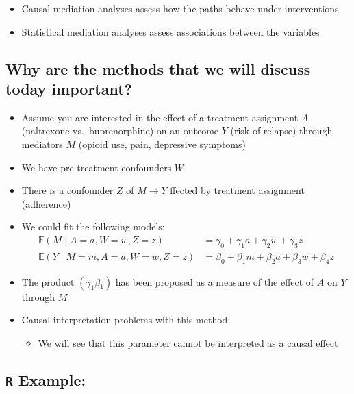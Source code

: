 \documentclass[
  12pt,
]{book}
\providecommand{\tightlist}{%
  \setlength{\itemsep}{0pt}\setlength{\parskip}{0pt}}
\theoremstyle{definition}
\theoremstyle{definition}
\theoremstyle{definition}
\newcommand{\E}{\mathbb{E}}
\newcommand{\1}{\mathbbm{1}}
\begin{document}
\begin{itemize}
\tightlist
\item
  Causal mediation analyses assess how the paths behave under interventions
\item
  Statistical mediation analyses assess associations between the variables
\end{itemize}

\hypertarget{why-are-the-methods-that-we-will-discuss-today-important}{%
\subsection{Why are the methods that we will discuss today important?}\label{why-are-the-methods-that-we-will-discuss-today-important}}

\begin{itemize}
\tightlist
\item
  Assume you are interested in the effect of a treatment assignment \(A\)
  (naltrexone vs.~buprenorphine) on an outcome \(Y\) (risk of relapse) through
  mediators \(M\) (opioid use, pain, depressive symptoms)
\item
  We have pre-treatment confounders \(W\)
\item
  There is a confounder \(Z\) of \(M\rightarrow Y\) ffected by treatment assignment
  (adherence)
\item
  We could fit the following models:
  \begin{align}
      \E(M\mid A=a, W=w, Z=z) & = \gamma_0 + \gamma_1 a + \gamma_2 w + \gamma_3 z \\
      \E(Y\mid M=m, A=a, W=w, Z=z) & = \beta_0 + \beta_1 m + \beta_2 a + \beta_3 w + \beta_4 z
    \end{align}
\item
  The product \((\gamma_1\beta_1)\) has been proposed as a measure of the effect
  of \(A\) on \(Y\) through \(M\)
\item
  Causal interpretation problems with this method:

  \begin{itemize}
  \tightlist
  \item
    We will see that this parameter cannot be interpreted as a causal effect
  \end{itemize}
\end{itemize}

\hypertarget{r-example}{%
\subsection{\texorpdfstring{\texttt{R} Example:}{R Example:}}\label{r-example}}
\end{document}
